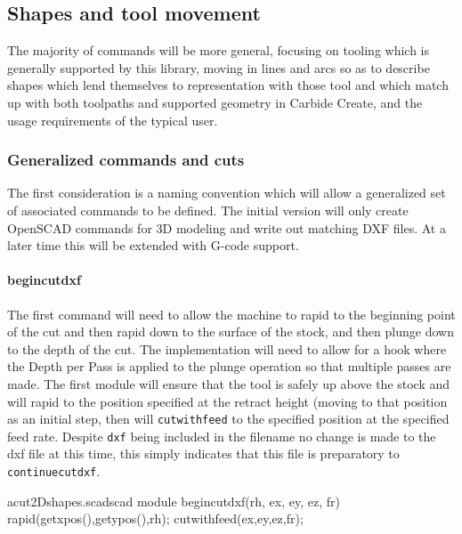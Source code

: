 \documentclass{ltxdoc}
\begin{document}
\addtocounter{cuttwod}{91}
 
\subsection{Shapes and tool movement}
 
The majority of commands will be more general, focusing on tooling which is generally
supported by this library, moving in lines and arcs so as to describe shapes which
lend themselves to representation with those tool and which match up with both
toolpaths and supported geometry in Carbide Create, and the usage requirements of
the typical user.

\subsubsection{Generalized commands and cuts}

The first consideration is a naming convention which will allow a generalized set of associated
commands to be defined. The initial version will only create OpenSCAD commands for 3D modeling
and write out matching DXF files. At a later time this will be extended with G-code support.
 
\paragraph{begincutdxf}
 
The first command will need to allow the machine to rapid to the beginning point of the cut
and then rapid down to the surface of the stock, and then plunge down to the depth of the cut.
The implementation will need to allow for a hook where the Depth per Pass is applied to the 
plunge operation so that multiple passes are made.
% 
 The first module will ensure that the tool is safely up above
the stock and will rapid to the position specified at the retract height (moving to that 
position as an initial step, then will \texttt{cutwithfeed} to the specified position
at the specified feed rate. Despite \texttt{dxf} being included in the filename no change
is made to the dxf file at this time, this simply indicates that this file is preparatory to
\texttt{continuecutdxf}.

\lstset{firstnumber=\thecuttwod}
\begin{writecode}{a}{cut2Dshapes.scad}{scad}
module begincutdxf(rh, ex, ey, ez, fr) {
  rapid(getxpos(),getypos(),rh);
  cutwithfeed(ex,ey,ez,fr);
}

\end{writecode}
\addtocounter{cuttwod}{5}
 
\end{document}
